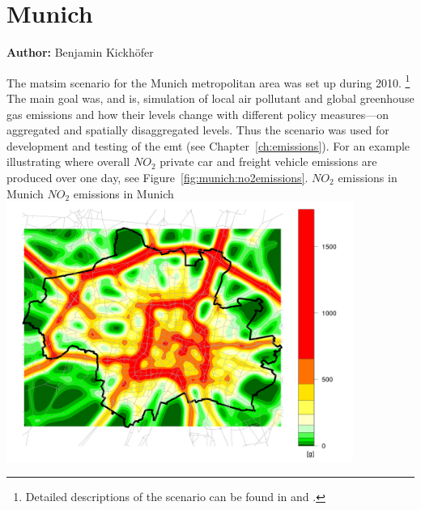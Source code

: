 \chapter{Munich}
\label{ch:munich}
\hfill \textbf{Author:} Benjamin Kickhöfer


The \gls{matsim} scenario for the Munich metropolitan area was set up during 2010.%
%
\footnote{
%
Detailed descriptions of the scenario can be found in \citet{KickhoeferEtAl_VanoutriveVerhetsel_2013} and \citet{Kickhoefer_PhDThesis_2014}.
%
}
%
The main goal was, and is, simulation of local air pollutant and global greenhouse gas emissions and how their levels change with different policy measures---on aggregated and spatially disaggregated levels. Thus the scenario was used for development and testing of the \gls{emt} (see Chapter~\ref{ch:emissions}). For an example illustrating where overall $\mathit{NO_2}$ private car and freight vehicle emissions are produced over one day, see Figure~\ref{fig:munich:no2emissions}.
%
\createfigure%
{$\mathit{NO_2}$ emissions in Munich}%
{$\mathit{NO_2}$ emissions in Munich}%
{\label{fig:munich:no2emissions}}%
{\includegraphics[width=0.85\textwidth, angle=0]{./scenarios/figures/baseCase_1500_NO2_g_108000_0.png}}%
{}

